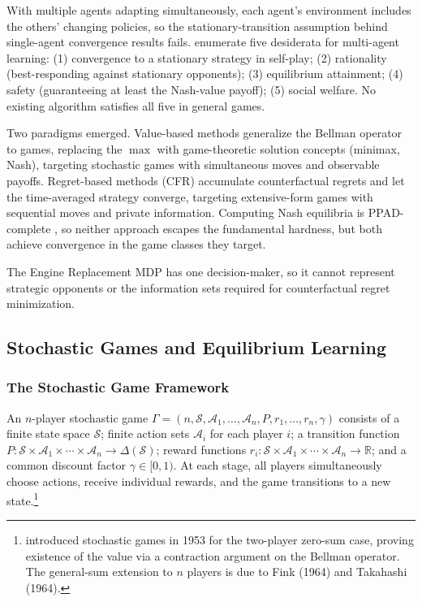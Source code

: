 
With multiple agents adapting simultaneously, each agent's environment includes the others' changing policies, so the stationary-transition assumption behind single-agent convergence results fails. \citet{shoham2007multiagent} enumerate five desiderata for multi-agent learning: (1) convergence to a stationary strategy in self-play; (2) rationality (best-responding against stationary opponents); (3) equilibrium attainment; (4) safety (guaranteeing at least the Nash-value payoff); (5) social welfare. No existing algorithm satisfies all five in general games.

Two paradigms emerged. Value-based methods generalize the Bellman operator to games, replacing the $\max$ with game-theoretic solution concepts (minimax, Nash), targeting stochastic games with simultaneous moves and observable payoffs. Regret-based methods (CFR) accumulate counterfactual regrets and let the time-averaged strategy converge, targeting extensive-form games with sequential moves and private information. Computing Nash equilibria is PPAD-complete \citep{Daskalakis2009}, so neither approach escapes the fundamental hardness, but both achieve convergence in the game classes they target.

The Engine Replacement MDP has one decision-maker, so it cannot represent strategic opponents or the information sets required for counterfactual regret minimization.

\subsection{Stochastic Games and Equilibrium Learning}

\subsubsection{The Stochastic Game Framework}

An $n$-player stochastic game $\Gamma = (n, \mathcal{S}, \mathcal{A}_1, \ldots, \mathcal{A}_n, P, r_1, \ldots, r_n, \gamma)$ consists of a finite state space $\mathcal{S}$; finite action sets $\mathcal{A}_i$ for each player $i$; a transition function $P: \mathcal{S} \times \mathcal{A}_1 \times \cdots \times \mathcal{A}_n \to \Delta(\mathcal{S})$; reward functions $r_i: \mathcal{S} \times \mathcal{A}_1 \times \cdots \times \mathcal{A}_n \to \mathbb{R}$; and a common discount factor $\gamma \in [0,1)$. At each stage, all players simultaneously choose actions, receive individual rewards, and the game transitions to a new state.\footnote{\citet{shapley1953stochastic} introduced stochastic games in 1953 for the two-player zero-sum case, proving existence of the value via a contraction argument on the Bellman operator. The general-sum extension to $n$ players is due to Fink (1964) and Takahashi (1964).}

